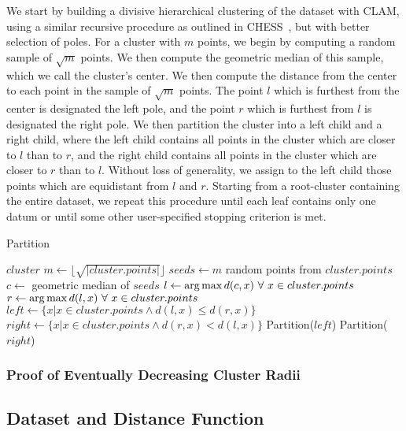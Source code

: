 We start by building a divisive hierarchical clustering of the dataset with CLAM, using a 
similar recursive procedure as outlined in CHESS~\cite{ishaq2019clustered}, but with better selection of 
poles. For a cluster with $m$ points, we begin by computing a 
random sample of $\sqrt m$ points. We then compute the geometric median of this sample, which we call the 
cluster's center. We then compute the distance from the center to each point in the sample of $\sqrt m$ points. 
The point $l$ which is furthest from the center is designated the left pole, and the point $r$ which is furthest
from $l$ is designated the right pole. We then partition the cluster into a left child and a right child, where the 
left child contains all points in the cluster which are closer to $l$ than to $r$, and the right child contains all 
points in the cluster which are closer to $r$ than to $l$. Without loss of generality, we assign to the left child 
those points which are equidistant from $l$ and $r$. Starting from a root-cluster containing the entire dataset, we 
repeat this procedure until each leaf contains only one datum or until some other user-specified stopping criterion 
is met.


\begin{algorithm} %
\caption{Partition} %
\label{alg:partition} %
\begin{algorithmic}[1] %
    \REQUIRE $cluster$
    \STATE $m \leftarrow \lfloor \sqrt{|cluster.points|} \rfloor$
    \STATE $seeds \leftarrow m$ random points from $cluster.points$
    \STATE $c \leftarrow$ geometric median of $seeds$
    \STATE $l \leftarrow \operatorname*{arg\,max} d(c,x) \ \forall \ x \in cluster.points$
    \STATE $r \leftarrow \operatorname*{arg\,max} d(l,x) \ \forall \ x \in cluster.points$
    \STATE $left \leftarrow \{x | x \in cluster.points \land d(l,x) \le d(r,x)\}$
    \STATE $right \leftarrow \{x | x \in cluster.points \land d(r,x) < d(l,x)\}$
        \STATE Partition($left$)
    \ENDIF
        \STATE Partition($right$)
    \ENDIF
\end{algorithmic}
\end{algorithm}

\subsubsection {Proof of Eventually Decreasing Cluster Radii}
\subsection{Dataset and Distance Function}
\label{subsec:methods:dataset-and-distance-function}

